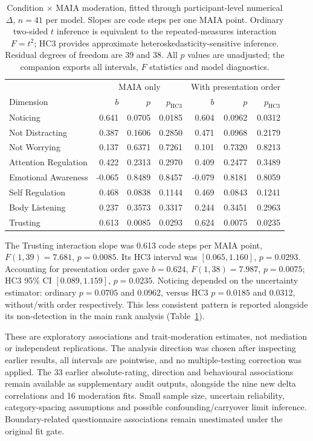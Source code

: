 \begin{table}[htbp]
\centering\small
\begin{tabular}{lrrrrrr}
\hline
& \multicolumn{3}{c}{MAIA only} & \multicolumn{3}{c}{With presentation order} \\
Dimension & $b$ & $p$ & $p_\mathrm{HC3}$ & $b$ & $p$ & $p_\mathrm{HC3}$ \\
\hline
Noticing & 0.641 & 0.0705 & 0.0185 & 0.604 & 0.0962 & 0.0312 \\
Not Distracting & 0.387 & 0.1606 & 0.2850 & 0.471 & 0.0968 & 0.2179 \\
Not Worrying & 0.137 & 0.6371 & 0.7261 & 0.101 & 0.7320 & 0.8213 \\
Attention Regulation & 0.422 & 0.2313 & 0.2970 & 0.409 & 0.2477 & 0.3489 \\
Emotional Awareness & -0.065 & 0.8489 & 0.8457 & -0.079 & 0.8181 & 0.8059 \\
Self Regulation & 0.468 & 0.0838 & 0.1144 & 0.469 & 0.0843 & 0.1241 \\
Body Listening & 0.237 & 0.3573 & 0.3317 & 0.244 & 0.3451 & 0.2963 \\
Trusting & 0.613 & 0.0085 & 0.0293 & 0.624 & 0.0075 & 0.0235 \\
\hline
\end{tabular}
\caption{Condition $\times$ MAIA moderation, fitted through participant-level numerical $\Delta$, $n=41$ per model. Slopes are code steps per one MAIA point. Ordinary two-sided $t$ inference is equivalent to the repeated-measures interaction $F=t^2$; HC3 provides approximate heteroskedasticity-sensitive inference. Residual degrees of freedom are 39 and 38. All $p$ values are unadjusted; the companion exports all intervals, $F$ statistics and model diagnostics.}
\label{study5:tab:spatial_moderation}
\end{table}

The Trusting interaction slope was 0.613 code steps per MAIA point, $F(1,39)=7.681$, $p=0.0085$. Its HC3 interval was $[0.065,1.160]$, $p=0.0293$. Accounting for presentation order gave $b=0.624$, $F(1,38)=7.987$, $p=0.0075$; HC3 95\% CI $[0.089,1.159]$, $p=0.0235$. Noticing depended on the uncertainty estimator: ordinary $p=0.0705$ and 0.0962, versus HC3 $p=0.0185$ and 0.0312, without/with order respectively. This less consistent pattern is reported alongside its non-detection in the main rank analysis (Table~\ref{study5:tab:spatial_moderation}).

These are exploratory associations and trait-moderation estimates, not mediation or independent replications. The analysis direction was chosen after inspecting earlier results, all intervals are pointwise, and no multiple-testing correction was applied. The 33 earlier absolute-rating, direction and behavioural associations remain available as supplementary audit outputs, alongside the nine new delta correlations and 16 moderation fits. Small sample size, uncertain reliability, category-spacing assumptions and possible confounding/carryover limit inference. Boundary-related questionnaire associations remain unestimated under the original fit gate.

